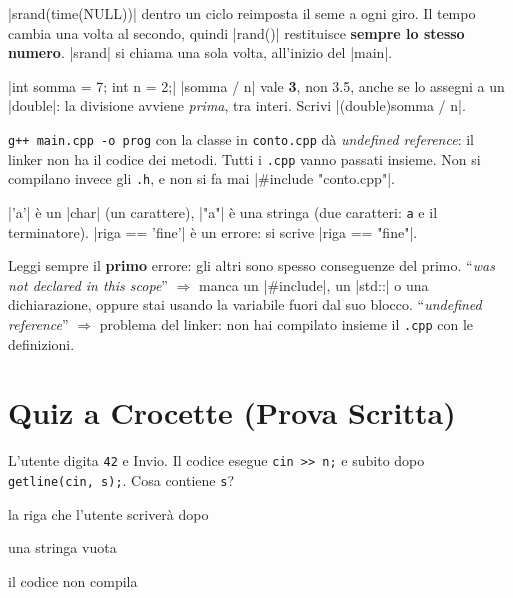 \begin{trappola}
\cc|srand(time(NULL))| dentro un ciclo reimposta il seme a ogni giro. Il tempo
cambia una volta al secondo, quindi \cc|rand()| restituisce \textbf{sempre lo
stesso numero}. \cc|srand| si chiama una sola volta, all'inizio del \cc|main|.
\end{trappola}

\begin{trappola}
\cc|int somma = 7; int n = 2;| \quad \cc|somma / n| vale \textbf{3}, non 3.5,
anche se lo assegni a un \cc|double|: la divisione avviene \emph{prima},
tra interi. Scrivi \cc|(double)somma / n|.
\end{trappola}

\begin{trappola}
\texttt{g++ main.cpp -o prog} con la classe in \texttt{conto.cpp} dà
\emph{undefined reference}: il linker non ha il codice dei metodi. Tutti i
\texttt{.cpp} vanno passati insieme. Non si compilano invece gli \texttt{.h},
e non si fa mai \cc|#include "conto.cpp"|.
\end{trappola}

\begin{consiglio}
\cc|'a'| è un \cc|char| (un carattere), \cc|"a"| è una stringa (due caratteri:
\texttt{a} e il terminatore). \cc|riga == 'fine'| è un errore: si scrive
\cc|riga == "fine"|.
\end{consiglio}

\begin{consiglio}
Leggi sempre il \textbf{primo} errore: gli altri sono spesso conseguenze del primo.
``\emph{was not declared in this scope}'' $\Rightarrow$ manca un \cc|#include|,
un \cc|std::| o una dichiarazione, oppure stai usando la variabile fuori dal suo
blocco. ``\emph{undefined reference}'' $\Rightarrow$ problema del linker: non
hai compilato insieme il \texttt{.cpp} con le definizioni.
\end{consiglio}

\section{Quiz a Crocette (Prova Scritta)}

\begin{quiz}{L'utente digita \texttt{42} e Invio. Il codice esegue \texttt{cin >> n;} e subito dopo \texttt{getline(cin, s);}. Cosa contiene \texttt{s}?}
  \item la riga che l'utente scriverà dopo
  \item una stringa vuota
  \item \texttt{\textquotedbl}
  \item il codice non compila
\end{quiz}

